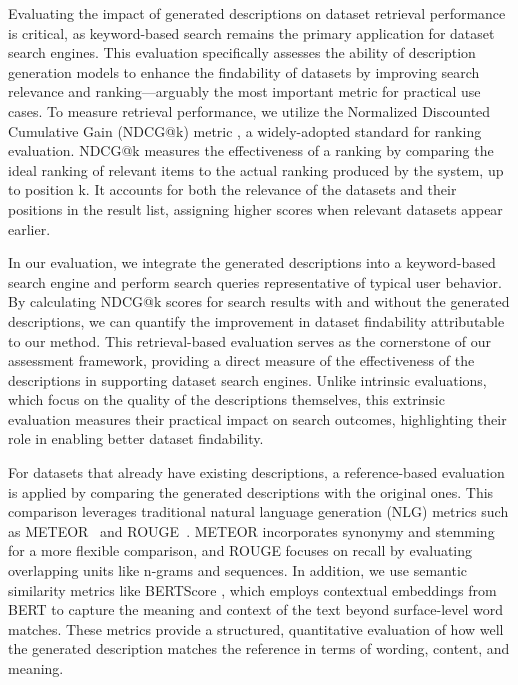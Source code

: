%
Evaluating the impact of generated descriptions on dataset retrieval performance is critical, as keyword-based search remains the primary application for dataset search engines. This evaluation specifically assesses the ability of description generation models to enhance the findability of datasets by improving search relevance and ranking—arguably the most important metric for practical use cases.
% 
To measure retrieval performance, we utilize the Normalized Discounted Cumulative Gain (NDCG@k) metric \cite{jarvelin2002ndcg}, a widely-adopted standard for ranking evaluation. NDCG@k measures the effectiveness of a ranking by comparing the ideal ranking of relevant items to the actual ranking produced by the system, up to position k. It accounts for both the relevance of the datasets and their positions in the result list, assigning higher scores when relevant datasets appear earlier. 

In our evaluation, we integrate the generated descriptions into a keyword-based search engine and perform search queries representative of typical user behavior. By calculating NDCG@k scores for search results with and without the generated descriptions, we can quantify the improvement in dataset findability attributable to our method. This retrieval-based evaluation serves as the cornerstone of our assessment framework, providing a direct measure of the effectiveness of the descriptions in supporting dataset search engines. Unlike intrinsic evaluations, which focus on the quality of the descriptions themselves, this extrinsic evaluation measures their practical impact on search outcomes, highlighting their role in enabling better dataset findability.

%
For datasets that already have existing descriptions, a  reference-based evaluation is applied by comparing the generated descriptions with the original ones. This comparison leverages traditional natural language generation (NLG) metrics such as METEOR~\cite{banerjee2005meteor} and ROUGE~\cite{lin2004rouge}. METEOR incorporates synonymy and stemming for a more flexible comparison, and ROUGE focuses on recall by evaluating overlapping units like n-grams and sequences. In addition, we use semantic similarity metrics like BERTScore \cite{zhang2019bertscore}, which employs contextual embeddings from BERT to capture the meaning and context of the text beyond surface-level word matches. These metrics provide a structured, quantitative evaluation of how well the generated description matches the reference in terms of wording, content, and meaning.

